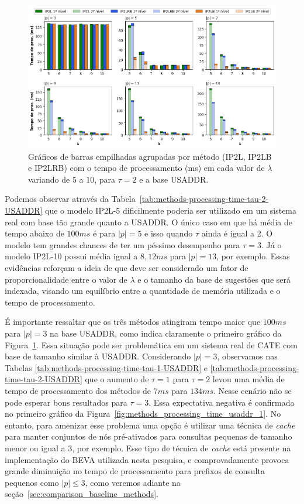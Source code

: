 \begin{figure} [h]
    \centering
    \includegraphics[width=1.0\textwidth]{figures/methods_processing_time_usaddr_2.png}
    \caption{Gráficos de barras empilhadas agrupadas por método (IP2L, IP2LB e IP2LRB) com o tempo de processamento (ms) em cada valor de $\lambda$ variando de $5$ a $10$, para $\tau=2$ e a base USADDR.}
    \label{fig:methods_processing_time_usaddr_2}
\end{figure}

Podemos observar através da Tabela~\ref{tab:methods-processing-time-tau-2-USADDR} que o modelo IP2L-5  dificilmente poderia ser utilizado em um sistema real com base tão grande quanto a USADDR. O único caso em que há média de tempo abaixo de $100ms$ é para $|p|=5$ e isso quando $\tau$ ainda é igual a 2. O modelo tem grandes chances de ter um péssimo desempenho para $\tau=3$. Já o modelo IP2L-10 possui média igual a $8,12ms$ para $|p|=13$, por exemplo. Essas evidências reforçam a ideia de que deve ser considerado um fator de proporcionalidade entre o valor de $\lambda$ e o tamanho da base de sugestões que será indexada, visando um equilíbrio entre a quantidade de memória utilizada e o tempo de processamento.

É importante ressaltar que os três métodos atingiram tempo maior que $100ms$ para $|p|=3$ na base USADDR, como indica claramente o primeiro gráfico da Figura~\ref{fig:methods_processing_time_usaddr_2}. Essa situação pode ser problemática em um sistema real de CATE com base de tamanho similar à USADDR. Considerando $|p|=3$, observamos nas Tabelas \ref{tab:methods-processing-time-tau-1-USADDR} e \ref{tab:methods-processing-time-tau-2-USADDR} que o aumento de $\tau=1$ para $\tau=2$ levou uma média de tempo de processamento dos métodos de $7ms$ para $134ms$. Nesse cenário não se pode esperar bons resultados para $\tau=3$. Essa expectativa negativa é confirmada no primeiro gráfico da Figura~\ref{fig:methods_processing_time_usaddr_1}. No entanto, para amenizar esse problema uma opção é utilizar uma técnica de \textit{cache} para manter conjuntos de nós pré-ativados para consultas pequenas de tamanho menor ou igual a 3, por exemplo. Esse tipo de técnica de \textit{cache} está presente na implementação do BEVA utilizada nesta pesquisa, e comprovadamente provoca grande diminuição no tempo de processamento para prefixos de consulta pequenos como $|p| \leq 3$, como veremos adiante na seção~\ref{sec:comparison_baseline_methods}.





